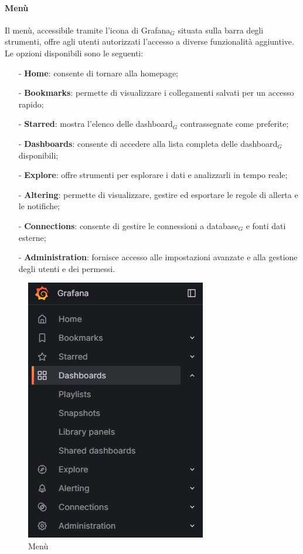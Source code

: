 \documentclass[10pt]{article}
\begin{document}
\begin{justify}
    \paragraph{Menù}
    Il menù, accessibile tramite l'icona di Grafana$_G$ situata sulla barra degli strumenti, offre agli utenti autorizzati l'accesso a diverse funzionalità aggiuntive. Le opzioni disponibili sono le seguenti:
    \begin{itemize}
        \item[-] \textbf{Home}: consente di tornare alla homepage;
        \item[-] \textbf{Bookmarks}: permette di visualizzare i collegamenti salvati per un accesso rapido;
        \item[-] \textbf{Starred}: mostra l'elenco delle dashboard$_G$ contrassegnate come preferite;
        \item[-] \textbf{Dashboards}: consente di accedere alla lista completa delle dashboard$_G$ disponibili;
        \item[-] \textbf{Explore}: offre strumenti per esplorare i dati e analizzarli in tempo reale;
        \item[-] \textbf{Altering}: permette di visualizzare, gestire ed esportare le regole di allerta e le notifiche;
        \item[-] \textbf{Connections}: consente di gestire le connessioni a database$_G$ e fonti dati esterne;
        \item[-] \textbf{Administration}: fornisce accesso alle impostazioni avanzate e alla gestione degli utenti e dei permessi.
    \end{itemize}
    \begin{figure}[H]
    \centering
    \includegraphics[width=0.35\linewidth]{menu.png}
    \caption{Menù}
    \end{figure}


\end{justify}
\end{document}
